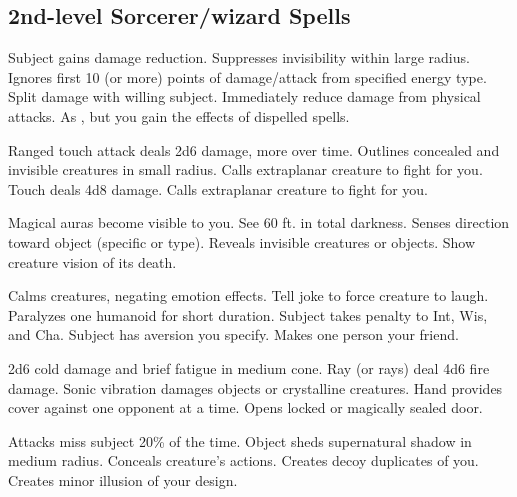 \subsection{2nd-level Sorcerer/wizard Spells} 
\begin{swspelllist}
   Subject gains damage reduction.
   Suppresses invisibility within large radius.
   Ignores first 10 (or more) points of damage/attack from specified energy type.
   Split damage with willing subject.
   Immediately reduce damage from physical attacks.
   As , but you gain the effects of dispelled spells.

   Ranged touch attack deals 2d6 damage, more over time.
   Outlines concealed and invisible creatures in small radius.
   Calls extraplanar creature to fight for you.
   Touch deals 4d8 damage.
   Calls extraplanar creature to fight for you.

   Magical auras become visible to you.
   See 60 ft. in total darkness.
   Senses direction toward object (specific or type).
   Reveals invisible creatures or objects.
   Show creature vision of its death.
  \spellheadrestricted{}

   Calms creatures, negating emotion effects.
   Tell joke to force creature to laugh. 
   Paralyzes one humanoid for short duration.
   Subject takes  penalty to Int, Wis, and Cha.
   Subject has aversion you specify.
   Makes one person your friend.

   2d6 cold damage and brief fatigue in medium cone.
   Ray (or rays) deal 4d6 fire damage.
   Sonic vibration damages objects or crystalline creatures.
   Hand provides cover against one opponent at a time.
   Opens locked or magically sealed door.

   Attacks miss subject 20\% of the time.
   Object sheds supernatural shadow in medium radius.
   Conceals creature's actions. 
   Creates decoy duplicates of you.
   Creates minor illusion of your design.


\end{swspelllist}
